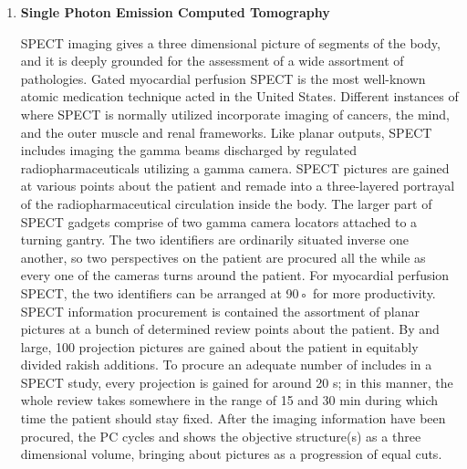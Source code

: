 \documentclass[12pt]{article}
\begin{document}
\begin{enumerate}
\item \textbf{Single Photon Emission Computed Tomography} \par
SPECT imaging gives a three dimensional picture of segments of the body, and it is deeply grounded for the assessment of a wide assortment of pathologies. Gated myocardial perfusion SPECT is the most well-known atomic medication technique acted in the United States. Different instances of where SPECT is normally utilized incorporate imaging of cancers, the mind, and the outer muscle and renal frameworks.
Like planar outputs, SPECT includes imaging the gamma beams discharged by regulated radiopharmaceuticals utilizing a gamma camera. SPECT pictures are gained at various points about the patient and remade into a three-layered portrayal of the radiopharmaceutical circulation inside the body. The larger part of SPECT gadgets comprise of two gamma camera locators attached to a turning gantry. The two identifiers are ordinarily situated inverse one another, so two perspectives on the patient are procured all the while as every one of the cameras turns around the patient. For myocardial perfusion SPECT, the two identifiers can be arranged at 90◦ for more productivity. SPECT information procurement is contained the assortment of planar pictures at a bunch of determined review points about the patient. By and large, 100 projection pictures are gained about the patient in equitably divided rakish additions. To procure an adequate number of includes in a SPECT study, every projection is gained for around 20 s; in this manner, the whole review takes somewhere in the range of 15 and 30 min during which time the patient should stay fixed. After the imaging information have been procured, the PC cycles and shows the objective structure(s) as a three dimensional volume, bringing about pictures as a progression of equal cuts.


\end{enumerate}
\end{document}
